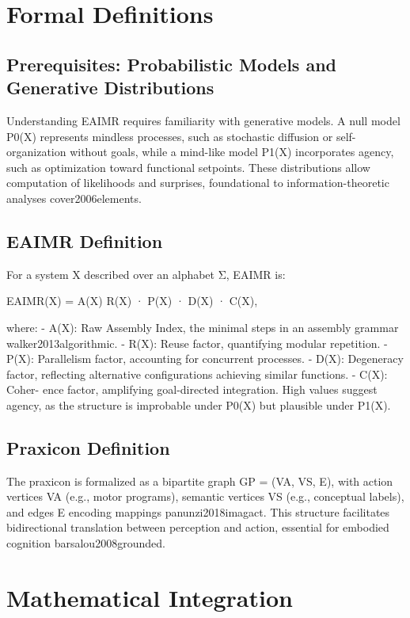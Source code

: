 \documentclass{article}
\begin{document}
\section{Formal Definitions}
\label{sec:formal}

\subsection{Prerequisites: Probabilistic Models and Generative Distributions}
Understanding EAIMR requires familiarity with generative models. A null model P0(X) represents mindless
processes, such as stochastic diffusion or self-organization without goals, while a mind-like model P1(X)
incorporates agency, such as optimization toward functional setpoints. These distributions allow computation
of likelihoods and surprises, foundational to information-theoretic analyses {cover2006elements}.

\subsection{EAIMR Definition}
For a system X described over an alphabet Σ, EAIMR is:

EAIMR(X) =
A(X)
R(X) · P(X) · D(X) · C(X),

where: - A(X): Raw Assembly Index, the minimal steps in an assembly grammar {walker2013algorithmic}. - R(X): Reuse
factor, quantifying modular repetition. - P(X): Parallelism factor, accounting for concurrent processes. -
D(X): Degeneracy factor, reflecting alternative configurations achieving similar functions. - C(X): Coher-
ence factor, amplifying goal-directed integration.
High values suggest agency, as the structure is improbable under P0(X) but plausible under P1(X).

\subsection{Praxicon Definition}
The praxicon is formalized as a bipartite graph GP = (VA, VS, E), with action vertices VA (e.g., motor
programs), semantic vertices VS (e.g., conceptual labels), and edges E encoding mappings {panunzi2018imagact}. This structure
facilitates bidirectional translation between perception and action, essential for embodied cognition {barsalou2008grounded}.

\section{Mathematical Integration}
\label{sec:integration}
\end{document}
